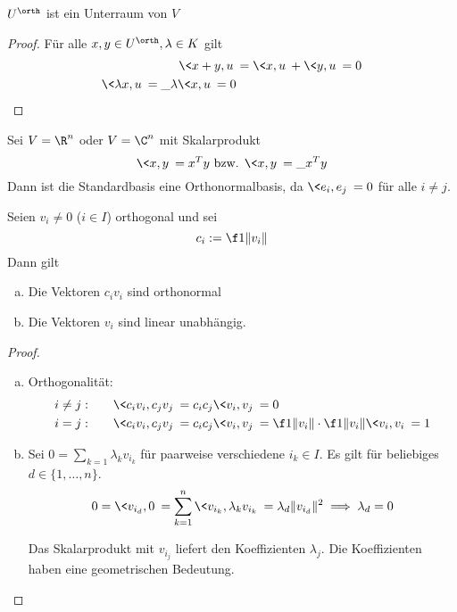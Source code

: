 \documentclass[a4paper, 10pt]{scrbook}
\begin{document}
\begin{st*}
	$U^\orth$ ist ein Unterraum von $V$
	\begin{proof}
		Für alle $x,y\in U^\orth, \lambda \in K$ gilt
		\begin{align*}
			\<x+y, u\> &= \<x,u\> + \<y,u\> = 0\\
			\<\lambda x, u\> = \_\lambda \<x,u\> = 0
		\end{align*}
	\end{proof}	
\end{st*}

\begin{ex}
	Sei $V=\R^n$ oder $V=\C^n$ mit Skalarprodukt
	\[
		\<x,y\> = x^Ty \text{ bzw. }\<x,y\>=\_{x}^Ty
	\]
	Dann ist die Standardbasis eine Orthonormalbasis, da $\<e_i, e_j\> = 0$ für alle $i\neq j$.
\end{ex}

\begin{lem}
	\label{lem:13.8}
	Seien $v_i \neq 0$ ($i\in I$) orthogonal und sei 
	\[
		c_i := \f 1{\|v_i\|}
	\]
	Dann gilt
	\begin{enumerate}[(a)]
		\item
			Die Vektoren $c_i v_i$ sind orthonormal
		\item
			Die Vektoren $v_i$ sind linear unabhängig.
	\end{enumerate}
	\begin{proof}
		\begin{enumerate}[(a)]
			\item
				Orthogonalität:
				\begin{align*}
					i\neq j: &\qquad \<c_i v_i, c_j v_j\> = c_ic_j\< v_i,v_j\> = 0\\
					i = j: &\qquad \<c_i v_i, c_j v_j\> = c_ic_j\< v_i,v_j\> = \f 1{\|v_i\|}\cdot \f 1{\|v_i\|} \<v_i,v_i\> = 1
				\end{align*}
			\item
				Sei $0= \sum_{k=1}\lambda_k v_{i_k}$ für paarweise verschiedene $i_k\in I$.
				Es gilt für beliebiges $d \in \{1,\dotsc, n\}$.
				\[
					0 = \<v_{i_d}, 0\> = \sum_{k=1}^n\<v_{i_k},\lambda_k v_{i_k}\> = \lambda_d \|v_{i_d}\|^2 \implies \lambda_d = 0
				\]
				\begin{note}
					Das Skalarprodukt mit $v_{i_j}$ liefert den Koeffizienten $\lambda_j$.
					Die Koeffizienten haben eine geometrischen Bedeutung.
				\end{note}
		\end{enumerate}
	\end{proof}
\end{lem}
\end{document}
